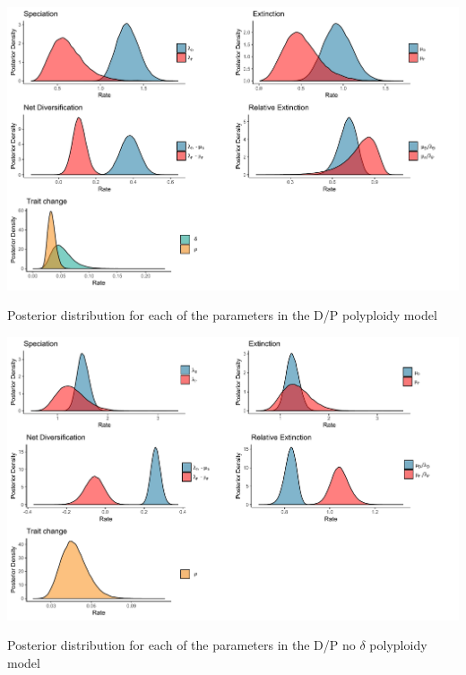 \begin{suppfigure}
\includegraphics[width=\textwidth]{bisseDPposteriordist.pdf}
\caption{Posterior distribution for each of the parameters in the D/P polyploidy model} %
\label{suppfigure:DP}
\end{suppfigure}

\begin{suppfigure}
\includegraphics[width=\textwidth]{bisseDPnodipposteriordist.pdf}
\caption{Posterior distribution for each of the parameters in the D/P no $\delta$ polyploidy model} %
\label{suppfigure:DPnodip}
\end{suppfigure}

